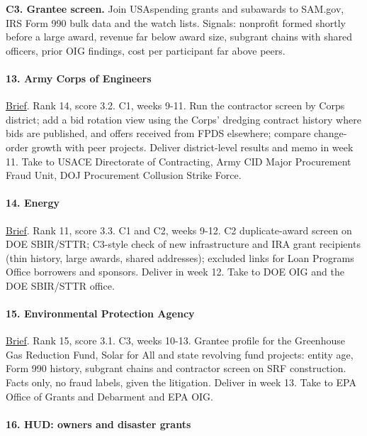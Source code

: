 \documentclass[letterpaper,11pt]{article}
\begin{document}
\textbf{C3. Grantee screen.} Join USAspending grants and subawards to
SAM.gov, IRS Form 990 bulk data and the watch lists. Signals: nonprofit
formed shortly before a large award, revenue far below award size,
subgrant chains with shared officers, prior OIG findings, cost per
participant far above peers.

\hypertarget{army-corps-of-engineers}{%
\paragraph{13. Army Corps of Engineers}\label{army-corps-of-engineers}}

\href{agencies/usace.pdf}{Brief}. Rank 14, score 3.2. C1, weeks 9-11.
Run the contractor screen by Corps district; add a bid rotation view
using the Corps' dredging contract history where bids are published, and
offers received from FPDS elsewhere; compare change-order growth with
peer projects. Deliver district-level results and memo in week 11. Take
to USACE Directorate of Contracting, Army CID Major Procurement Fraud
Unit, DOJ Procurement Collusion Strike Force.

\hypertarget{energy}{%
\paragraph{14. Energy}\label{energy}}

\href{agencies/doe.pdf}{Brief}. Rank 11, score 3.3. C1 and C2, weeks
9-12. C2 duplicate-award screen on DOE SBIR/STTR; C3-style check of new
infrastructure and IRA grant recipients (thin history, large awards,
shared addresses); excluded links for Loan Programs Office borrowers and
sponsors. Deliver in week 12. Take to DOE OIG and the DOE SBIR/STTR
office.

\hypertarget{environmental-protection-agency}{%
\paragraph{15. Environmental Protection
Agency}\label{environmental-protection-agency}}

\href{agencies/epa.pdf}{Brief}. Rank 15, score 3.1. C3, weeks 10-13.
Grantee profile for the Greenhouse Gas Reduction Fund, Solar for All and
state revolving fund projects: entity age, Form 990 history, subgrant
chains and contractor screen on SRF construction. Facts only, no fraud
labels, given the litigation. Deliver in week 13. Take to EPA Office of
Grants and Debarment and EPA OIG.

\hypertarget{hud-owners-and-disaster-grants}{%
\paragraph{16. HUD: owners and disaster
grants}\label{hud-owners-and-disaster-grants}}
\end{document}
